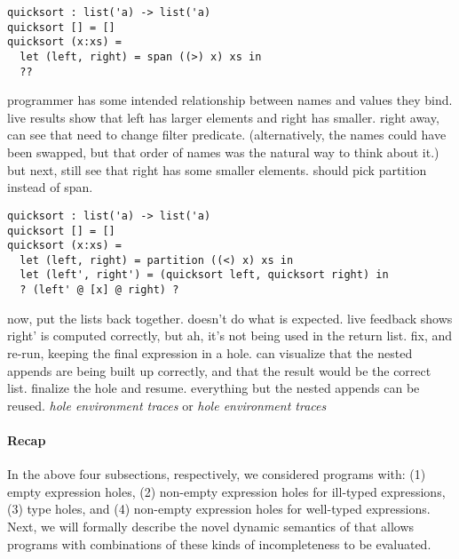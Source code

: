 


\begin{lstlisting}
quicksort : list('a) -> list('a)
quicksort [] = []
quicksort (x:xs) =
  let (left, right) = span ((>) x) xs in
  ??
\end{lstlisting}

programmer has some intended relationship between names and values they bind.
%
live results show that left has larger elements and right has smaller.
%
right away, can see that need to change filter predicate. (alternatively, the
names could have been swapped, but that order of names was the natural way
to think about it.)
%
but next, still see that right has some smaller elements.
%
should pick partition instead of span.

\begin{lstlisting}
quicksort : list('a) -> list('a)
quicksort [] = []
quicksort (x:xs) =
  let (left, right) = partition ((<) x) xs in
  let (left', right') = (quicksort left, quicksort right) in
  ? (left' @ [x] @ right) ?
\end{lstlisting}

now, put the lists back together.
%
doesn't do what is expected.
%
live feedback shows right' is computed correctly, but ah, it's not being used
in the return list.
%
fix, and re-run, keeping the final expression in a hole.
%
can visualize that the nested appends are being built up correctly, and that the
result would be the correct list.
%
finalize the hole and resume. everything but the nested appends can be reused.
%
\emph{hole environment traces} or \emph{hole environment traces}

\paragraph{Recap}
%
In the above four subsections, respectively, we considered programs with:
%
(1) empty expression holes,
%
(2) non-empty expression holes for ill-typed expressions,
%
(3) type holes, and
%
(4) non-empty expression holes for well-typed expressions.
%
Next, we will formally describe the novel dynamic semantics of \HazelnutLive{}
that allows programs with combinations of these kinds of incompleteness to be
evaluated.
